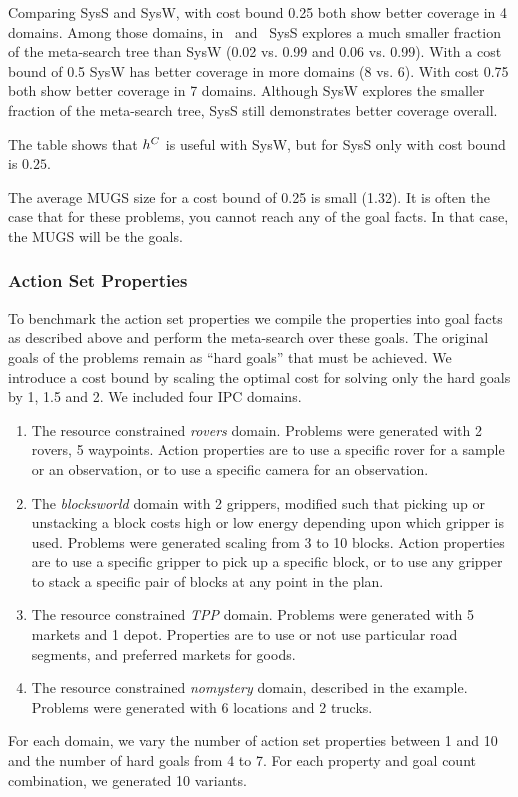 Comparing SysS and SysW, with cost bound 0.25 both show better coverage in 4 domains. Among those domains, in \woodworking\ and \openstacks\ SysS explores a much smaller fraction of the meta-search tree than SysW (0.02 vs. 0.99 and 0.06 vs. 0.99). With a cost bound of 0.5 SysW has better coverage in more domains (8 vs. 6). With cost 0.75 both show better coverage in 7 domains. Although SysW explores the smaller fraction of the meta-search tree, SysS still demonstrates better coverage overall. 

The table shows that $h^C$ is useful with SysW, but for SysS only with cost bound is $0.25$.

The average MUGS size for a cost bound of 0.25 is small (1.32). It is often the case that for these problems, you cannot reach any of the goal facts. In that case, the MUGS will be the goals.





\subsubsection*{Action Set Properties}


To benchmark the action set properties we compile the properties into goal facts as described above and perform the meta-search over these goals. The original goals of the problems remain as ``hard goals'' that must be achieved.
We introduce a cost bound by scaling the optimal cost for solving only the hard goals by 1, 1.5 and 2.
We included four IPC domains.
\begin{enumerate}
\item The resource constrained \textit{rovers} domain. Problems were generated with 2 rovers, 5 waypoints. Action properties are to use a specific rover for a sample or an observation, or to use a specific camera for an observation. 
\item The \textit{blocksworld} domain with 2 grippers, modified such that picking up or unstacking a block costs high or low energy depending upon which gripper is used. Problems were generated scaling from 3 to 10 blocks. Action properties are to use a specific gripper to pick up a specific block, or to use any gripper to stack a specific pair of blocks at any point in the plan.
\item The resource constrained \textit{TPP} domain. Problems were generated with 5 markets and 1 depot. Properties are to use or not use particular road segments, and preferred markets for goods.
\item The resource constrained \textit{nomystery} domain, described in the example. Problems were generated with 6 locations and 2 trucks.
\end{enumerate}
For each domain, we vary the number of action set properties between 1 and 10 and the number of hard goals from 4 to 7. For each property and goal count combination, we generated 10 variants.

